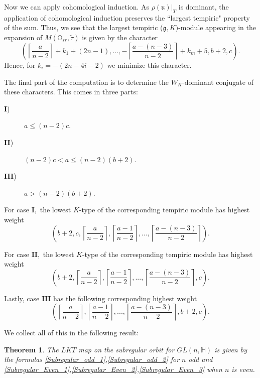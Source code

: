 \documentclass[letterpaper,twosided,11pt]{article}
\theoremstyle{plain}
\newtheorem{theorem}{Theorem}[section]
\theoremstyle{definition}
\theoremstyle{remark}
\newcommand{\HH}{\mathbb{H}}
\newcommand{\lie}[1]{\mathfrak{#1}}
\begin{document}
Now we can apply cohomological induction. As $\rho(\lie{u})|_T$ is dominant, the application 
of cohomological induction preserves the ``largest tempiric" property of the sum. Thus, we see
that the largest tempiric ($\lie{g},K)$-module appearing in the expansion of $M(\mathbb{O}_{sr},\tilde{\tau})$ is 
given by the character \[ \left( \left\lceil \frac{a}{n-2} \right \rceil+k_1+(2n-1),...,-\left\lceil \frac{a-(n-3)}{n-2} \right \rceil +k_{m}+5, b+2,c \right).\]
    Hence, for $k_i=-(2n-4i-2)$ we minimize this character. 
    
The final part of the computation is to determine the $W_K$-dominant 
conjugate of these characters. This comes in three parts: 
\begin{description} 
	\item[\textbf{I})] $a\leq (n-2)c.$
	\item[\textbf{II})] $(n-2)c<a\leq (n-2)(b+2).$
	\item[\textbf{III})] $a>(n-2)(b+2).$  
\end{description} 
For case $\textbf{I},$ the lowest $K$-type of the corresponding tempiric module
 has highest weight \begin{equation}\label{Subregular_Even_1} \left(b+2,c, \left\lceil \frac{a}{n-2} \right \rceil, \left\lceil \frac{a-1}
    {n-2} \right \rceil,...,\left\lceil \frac{a-(n-3)}{n-2} \right \rceil\right).\end{equation} 

For case $\textbf{II},$ the lowest $K$-type of the corresponding tempiric module
 has highest weight \begin{equation}\label{Subregular_Even_2} \left(b+2, \left\lceil \frac{a}{n-2} \right \rceil, \left\lceil \frac{a-1}
    {n-2} \right \rceil,...,\left\lceil \frac{a-(n-3)}{n-2} \right \rceil,c\right).\end{equation} 
    
 Lastly, case $\textbf{III}$ has the following corresponding highest weight 
 \begin{equation}\label{Subregular_Even_3} \left( \left\lceil \frac{a}{n-2} \right \rceil, \left\lceil \frac{a-1}
    {n-2} \right \rceil,...,\left\lceil \frac{a-(n-3)}{n-2} \right \rceil,b+2,c\right).\end{equation} 
    
We collect all of this in the following result: 

\begin{theorem} 
	The $LKT$ map on the subregular orbit for $GL(n,\HH)$ is 
	given by the formulas \ref{Subregular_odd_1},\ref{Subregular_odd_2} for $n$
	 odd and \ref{Subregular_Even_1},\ref{Subregular_Even_2},\ref{Subregular_Even_3} 
	 when $n$ is even. 
\end{theorem} 
   
\end{document}
